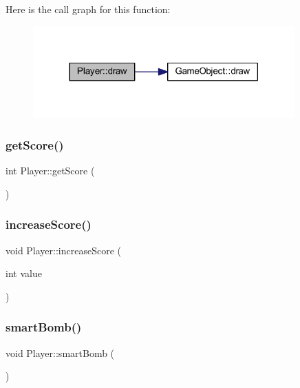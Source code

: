 Here is the call graph for this function\+:
\nopagebreak
\begin{figure}[H]
\begin{center}
\leavevmode
\includegraphics[width=285pt]{class_player_a0ca934f76860c378cd991a8a32f27edd_cgraph}
\end{center}
\end{figure}
\mbox{\label{class_player_a97e5447778ae6c384eedc532dcd8431d}} 
\subsubsection{\texorpdfstring{get\+Score()}{getScore()}}
{\footnotesize\ttfamily int Player\+::get\+Score (\begin{DoxyParamCaption}{ }\end{DoxyParamCaption})}

\mbox{\label{class_player_ae94e58713320d69a0b36c7b864cb6178}} 
\subsubsection{\texorpdfstring{increase\+Score()}{increaseScore()}}
{\footnotesize\ttfamily void Player\+::increase\+Score (\begin{DoxyParamCaption}\item[{int}]{value }\end{DoxyParamCaption})}

\mbox{\label{class_player_a3f5229f0a7a2e16f65ea174c46f14567}} 
\subsubsection{\texorpdfstring{smart\+Bomb()}{smartBomb()}}
{\footnotesize\ttfamily void Player\+::smart\+Bomb (\begin{DoxyParamCaption}{ }\end{DoxyParamCaption})}

